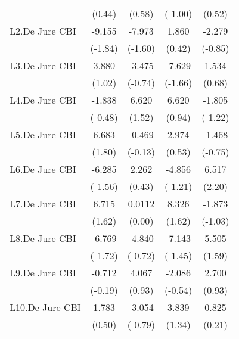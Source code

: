 {\begin{longtable}{l*{4}{c}}
                &   (0.44)         &   (0.58)         &  (-1.00)         &   (0.52)         \\
[1em]
L2.De Jure CBI  &   -9.155         &   -7.973         &    1.860         &   -2.279         \\
                &  (-1.84)         &  (-1.60)         &   (0.42)         &  (-0.85)         \\
[1em]
L3.De Jure CBI  &    3.880         &   -3.475         &   -7.629         &    1.534         \\
                &   (1.02)         &  (-0.74)         &  (-1.66)         &   (0.68)         \\
[1em]
L4.De Jure CBI  &   -1.838         &    6.620         &    6.620         &   -1.805         \\
                &  (-0.48)         &   (1.52)         &   (0.94)         &  (-1.22)         \\
[1em]
L5.De Jure CBI  &    6.683         &   -0.469         &    2.974         &   -1.468         \\
                &   (1.80)         &  (-0.13)         &   (0.53)         &  (-0.75)         \\
[1em]
L6.De Jure CBI  &   -6.285         &    2.262         &   -4.856         &    6.517\sym{*}  \\
                &  (-1.56)         &   (0.43)         &  (-1.21)         &   (2.20)         \\
[1em]
L7.De Jure CBI  &    6.715         &   0.0112         &    8.326         &   -1.873         \\
                &   (1.62)         &   (0.00)         &   (1.62)         &  (-1.03)         \\
[1em]
L8.De Jure CBI  &   -6.769         &   -4.840         &   -7.143         &    5.505         \\
                &  (-1.72)         &  (-0.72)         &  (-1.45)         &   (1.59)         \\
[1em]
L9.De Jure CBI  &   -0.712         &    4.067         &   -2.086         &    2.700         \\
                &  (-0.19)         &   (0.93)         &  (-0.54)         &   (0.93)         \\
[1em]
L10.De Jure CBI &    1.783         &   -3.054         &    3.839         &    0.825         \\
                &   (0.50)         &  (-0.79)         &   (1.34)         &   (0.21)         \\

\end{longtable}}
